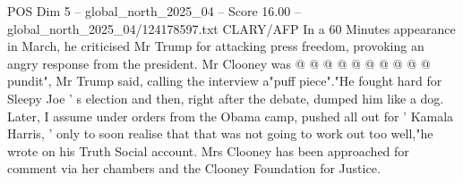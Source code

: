 \begin{textsample}{POS Dim 5 – global\_north\_2025\_04 – Score 16.00 – global\_north\_2025\_04/124178597.txt}
CLARY/AFP In a 60 Minutes appearance in March, he criticised Mr Trump for attacking press freedom, provoking an angry response from the president.
Mr Clooney was @ @ @ @ @ @ @ @ @ @ pundit", Mr Trump said, calling the interview a"puff piece"."He fought hard for Sleepy Joe ' s election and then, right after the debate, dumped him like a dog.
Later, I assume under orders from the Obama camp, pushed all out for ' Kamala Harris, ' only to soon realise that that was not going to work out too well,"he wrote on his Truth Social account.
Mrs Clooney has been approached for comment via her chambers and the Clooney Foundation for Justice.

\end{textsample}
